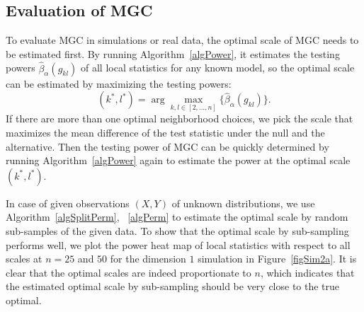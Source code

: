 \documentclass[11pt]{article}
\begin{document}
\subsection{Evaluation of MGC}
\label{appen:eval}

To evaluate MGC in simulations or real data, the optimal scale of MGC needs to be estimated first. By running Algorithm~\ref{algPower}, it estimates the testing powers $\hat{\beta}_{\alpha}(g_{kl})$ of all local statistics for any known model, so the optimal scale can be estimated by maximizing the testing powers:
\begin{equation}
\label{power}
(k^{*},l^{*})=\arg\max_{k,l \in [2,\ldots,n] }\{\hat{\beta}_{\alpha}(g_{kl})\}.
\end{equation}
If there are more than one optimal neighborhood choices, we pick the scale that maximizes the mean difference of the test statistic under the null and the alternative. Then the testing power of MGC can be quickly determined by running Algorithm~\ref{algPower} again to estimate the power at the optimal scale $(k^{*},l^{*})$. 

In case of given observations $(X,Y)$ of unknown distributions, we use Algorithm~\ref{algSplitPerm}, ~\ref{algPerm} to estimate the optimal scale by random sub-samples of the given data. To show that the optimal scale by sub-sampling performs well, we plot the power heat map of local statistics with respect to all scales at $n=25$ and $50$ for the dimension $1$ simulation in Figure~\ref{figSim2a}. It is clear that the optimal scales are indeed proportionate to $n$, which indicates that the estimated optimal scale by sub-sampling should be very close to the true optimal. 
\end{document}
